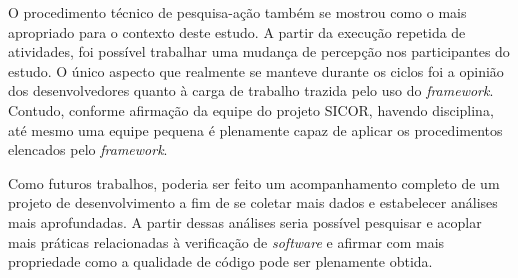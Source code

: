 O procedimento técnico de pesquisa-ação também se mostrou como o mais apropriado para o contexto deste estudo. A partir da execução repetida de atividades, foi possível trabalhar uma mudança de percepção nos participantes do estudo. O único aspecto que realmente se manteve durante os ciclos foi a opinião dos desenvolvedores quanto à carga de trabalho trazida pelo uso do \textit{framework}. Contudo, conforme afirmação da equipe do projeto SICOR, havendo disciplina, até mesmo uma equipe pequena é plenamente capaz de aplicar os procedimentos elencados pelo \textit{framework}.

Como futuros trabalhos, poderia ser feito um acompanhamento completo de um projeto de desenvolvimento a fim de se coletar mais dados e estabelecer análises mais aprofundadas. A partir dessas análises seria possível pesquisar e acoplar mais práticas relacionadas à verificação de \textit{software} e afirmar com mais propriedade como a qualidade de código pode ser plenamente obtida.